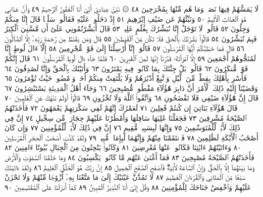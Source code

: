 لَا يَمَسُّهُمْ فِيهَا نَصَبࣱ وَمَا هُم مِّنْهَا بِمُخْرَجِينَ ٤٨
۞ نَبِّئْ عِبَادِيٓ أَنِّيٓ أَنَا ٱلْغَفُورُ ٱلرَّحِيمُ ٤٩ وَأَنَّ عَذَابِي
هُوَ ٱلْعَذَابُ ٱلْأَلِيمُ ٥٠ وَنَبِّئْهُمْ عَن ضَيْفِ إِبْرَٰهِيمَ ٥١
إِذْ دَخَلُوا۟ عَلَيْهِ فَقَالُوا۟ سَلَٰمࣰا قَالَ إِنَّا مِنكُمْ وَجِلُونَ ٥٢ قَالُوا۟
لَا تَوْجَلْ إِنَّا نُبَشِّرُكَ بِغُلَٰمٍ عَلِيمࣲ ٥٣ قَالَ أَبَشَّرْتُمُونِي عَلَىٰٓ أَن
مَّسَّنِيَ ٱلْكِبَرُ فَبِمَ تُبَشِّرُونَ ٥٤ قَالُوا۟ بَشَّرْنَٰكَ بِٱلْحَقِّ
فَلَا تَكُن مِّنَ ٱلْقَٰنِطِينَ ٥٥ قَالَ وَمَن يَقْنَطُ مِن رَّحْمَةِ
رَبِّهِۦٓ إِلَّا ٱلضَّآلُّونَ ٥٦ قَالَ فَمَا خَطْبُكُمْ أَيُّهَا ٱلْمُرْسَلُونَ ٥٧
قَالُوٓا۟ إِنَّآ أُرْسِلْنَآ إِلَىٰ قَوْمࣲ مُّجْرِمِينَ ٥٨ إِلَّآ ءَالَ لُوطٍ
إِنَّا لَمُنَجُّوهُمْ أَجْمَعِينَ ٥٩ إِلَّا ٱمْرَأَتَهُۥ قَدَّرْنَآ إِنَّهَا لَمِنَ
ٱلْغَٰبِرِينَ ٦٠ فَلَمَّا جَآءَ ءَالَ لُوطٍ ٱلْمُرْسَلُونَ ٦١ قَالَ
إِنَّكُمْ قَوْمࣱ مُّنكَرُونَ ٦٢ قَالُوا۟ بَلْ جِئْنَٰكَ بِمَا كَانُوا۟ فِيهِ
يَمْتَرُونَ ٦٣ وَأَتَيْنَٰكَ بِٱلْحَقِّ وَإِنَّا لَصَٰدِقُونَ ٦٤ فَأَسْرِ
بِأَهْلِكَ بِقِطْعࣲ مِّنَ ٱلَّيْلِ وَٱتَّبِعْ أَدْبَٰرَهُمْ وَلَا يَلْتَفِتْ مِنكُمْ أَحَدࣱ
وَٱمْضُوا۟ حَيْثُ تُؤْمَرُونَ ٦٥ وَقَضَيْنَآ إِلَيْهِ ذَٰلِكَ ٱلْأَمْرَ أَنَّ
دَابِرَ هَٰٓؤُلَآءِ مَقْطُوعࣱ مُّصْبِحِينَ ٦٦ وَجَآءَ أَهْلُ ٱلْمَدِينَةِ
يَسْتَبْشِرُونَ ٦٧ قَالَ إِنَّ هَٰٓؤُلَآءِ ضَيْفِي فَلَا تَفْضَحُونِ ٦٨
وَٱتَّقُوا۟ ٱللَّهَ وَلَا تُخْزُونِ ٦٩ قَالُوٓا۟ أَوَلَمْ نَنْهَكَ عَنِ ٱلْعَٰلَمِينَ ٧٠
قَالَ هَٰٓؤُلَآءِ بَنَاتِيٓ إِن كُنتُمْ فَٰعِلِينَ ٧١ لَعَمْرُكَ إِنَّهُمْ لَفِي سَكْرَتِهِمْ
يَعْمَهُونَ ٧٢ فَأَخَذَتْهُمُ ٱلصَّيْحَةُ مُشْرِقِينَ ٧٣ فَجَعَلْنَا عَٰلِيَهَا
سَافِلَهَا وَأَمْطَرْنَا عَلَيْهِمْ حِجَارَةࣰ مِّن سِجِّيلٍ ٧٤ إِنَّ فِي ذَٰلِكَ
لَأٓيَٰتࣲ لِّلْمُتَوَسِّمِينَ ٧٥ وَإِنَّهَا لَبِسَبِيلࣲ مُّقِيمٍ ٧٦ إِنَّ فِي ذَٰلِكَ
لَأٓيَةࣰ لِّلْمُؤْمِنِينَ ٧٧ وَإِن كَانَ أَصْحَٰبُ ٱلْأَيْكَةِ لَظَٰلِمِينَ ٧٨
فَٱنتَقَمْنَا مِنْهُمْ وَإِنَّهُمَا لَبِإِمَامࣲ مُّبِينࣲ ٧٩ وَلَقَدْ كَذَّبَ أَصْحَٰبُ
ٱلْحِجْرِ ٱلْمُرْسَلِينَ ٨٠ وَءَاتَيْنَٰهُمْ ءَايَٰتِنَا فَكَانُوا۟ عَنْهَا مُعْرِضِينَ ٨١
وَكَانُوا۟ يَنْحِتُونَ مِنَ ٱلْجِبَالِ بُيُوتًا ءَامِنِينَ ٨٢ فَأَخَذَتْهُمُ
ٱلصَّيْحَةُ مُصْبِحِينَ ٨٣ فَمَآ أَغْنَىٰ عَنْهُم مَّا كَانُوا۟ يَكْسِبُونَ ٨٤
وَمَا خَلَقْنَا ٱلسَّمَٰوَٰتِ وَٱلْأَرْضَ وَمَا بَيْنَهُمَآ إِلَّا بِٱلْحَقِّۗ وَإِنَّ
ٱلسَّاعَةَ لَأٓتِيَةࣱۖ فَٱصْفَحِ ٱلصَّفْحَ ٱلْجَمِيلَ ٨٥ إِنَّ رَبَّكَ هُوَ
ٱلْخَلَّٰقُ ٱلْعَلِيمُ ٨٦ وَلَقَدْ ءَاتَيْنَٰكَ سَبْعࣰا مِّنَ ٱلْمَثَانِي
وَٱلْقُرْءَانَ ٱلْعَظِيمَ ٨٧ لَا تَمُدَّنَّ عَيْنَيْكَ إِلَىٰ مَا مَتَّعْنَا بِهِۦٓ أَزْوَٰجࣰا
مِّنْهُمْ وَلَا تَحْزَنْ عَلَيْهِمْ وَٱخْفِضْ جَنَاحَكَ لِلْمُؤْمِنِينَ ٨٨ وَقُلْ
إِنِّيٓ أَنَا ٱلنَّذِيرُ ٱلْمُبِينُ ٨٩ كَمَآ أَنزَلْنَا عَلَى ٱلْمُقْتَسِمِينَ ٩٠
